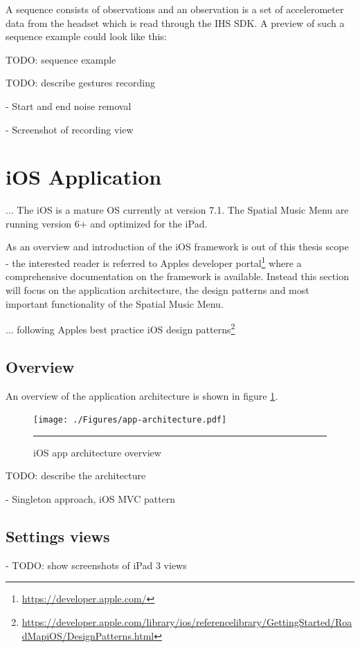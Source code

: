 A sequence consists of observations and an observation is a set of accelerometer data from the headset which is read through the IHS SDK. A preview of such a sequence example could look like this:

TODO: sequence example


TODO: describe gestures recording

- Start and end noise removal

- Screenshot of recording view


\section{iOS Application}
...
The iOS is a mature OS currently at version 7.1. The Spatial Music Menu are running version 6+ and optimized for the iPad.

As an overview and introduction of the iOS framework is out of this thesis scope - the interested reader is referred to Apples developer portal\footnote{\url{https://developer.apple.com/}} where a comprehensive documentation on the framework is available. Instead this section will focus on the application architecture, the design patterns and most important functionality of the Spatial Music Menu.

... following Apples best practice iOS design patterns\footnote{\url{https://developer.apple.com/library/ios/referencelibrary/GettingStarted/RoadMapiOS/DesignPatterns.html}}

\subsection{Overview}
An overview of the application architecture is shown in figure \ref{fig:apparchitecture}.

\begin{figure}[htbp]
	\centering
		\texttt{[image: ./Figures/app-architecture.pdf]}
		\rule{35em}{1pt}
	\caption[App architecture]{iOS app architecture overview}
	\label{fig:apparchitecture}
\end{figure}

TODO: describe the architecture

- Singleton approach, iOS MVC pattern

\subsection{Settings views}
- TODO: show screenshots of iPad 3 views








